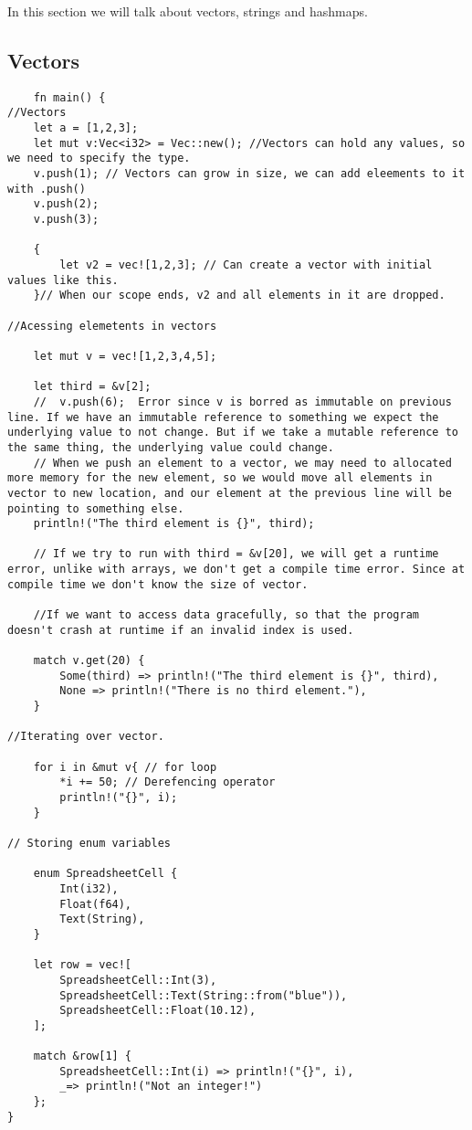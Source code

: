 In this section we will talk about vectors, strings and hashmaps.
\newpage
\subsection{Vectors}
\begin{lstlisting}
    fn main() {
//Vectors
    let a = [1,2,3];
    let mut v:Vec<i32> = Vec::new(); //Vectors can hold any values, so we need to specify the type.
    v.push(1); // Vectors can grow in size, we can add eleements to it with .push()
    v.push(2);
    v.push(3);

    {
        let v2 = vec![1,2,3]; // Can create a vector with initial values like this.
    }// When our scope ends, v2 and all elements in it are dropped.

//Acessing elemetents in vectors

    let mut v = vec![1,2,3,4,5];

    let third = &v[2];
    //  v.push(6);  Error since v is borred as immutable on previous line. If we have an immutable reference to something we expect the underlying value to not change. But if we take a mutable reference to the same thing, the underlying value could change.
    // When we push an element to a vector, we may need to allocated more memory for the new element, so we would move all elements in vector to new location, and our element at the previous line will be pointing to something else.
    println!("The third element is {}", third);

    // If we try to run with third = &v[20], we will get a runtime error, unlike with arrays, we don't get a compile time error. Since at compile time we don't know the size of vector. 

    //If we want to access data gracefully, so that the program doesn't crash at runtime if an invalid index is used.

    match v.get(20) {
        Some(third) => println!("The third element is {}", third),
        None => println!("There is no third element."),
    }

//Iterating over vector.

    for i in &mut v{ // for loop
        *i += 50; // Derefencing operator
        println!("{}", i);
    }

// Storing enum variables

    enum SpreadsheetCell {
        Int(i32),
        Float(f64),
        Text(String),
    }

    let row = vec![
        SpreadsheetCell::Int(3),
        SpreadsheetCell::Text(String::from("blue")),
        SpreadsheetCell::Float(10.12),
    ];

    match &row[1] {
        SpreadsheetCell::Int(i) => println!("{}", i),
        _=> println!("Not an integer!")
    };
}
\end{lstlisting}

